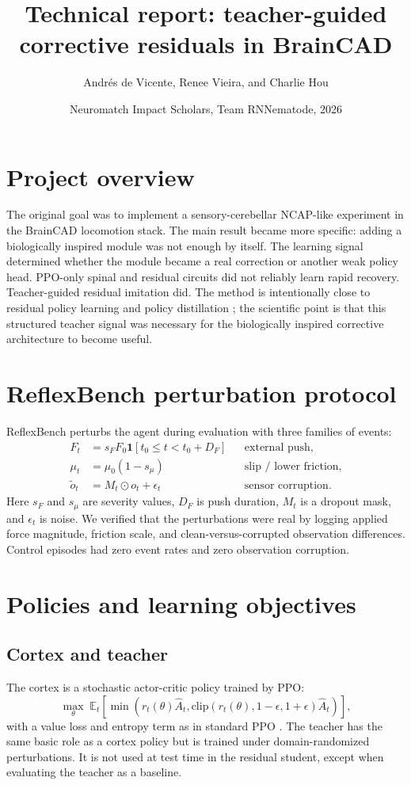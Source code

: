 \documentclass[11pt]{article}
\title{Technical report: teacher-guided corrective residuals in BrainCAD}
\author{Andr\'es de Vicente, Renee Vieira, and Charlie Hou}
\date{Neuromatch Impact Scholars, Team RNNematode, 2026}
\begin{document}
\maketitle

\section{Project overview}
The original goal was to implement a sensory-cerebellar NCAP-like experiment in the BrainCAD locomotion stack.  The main result became more specific: adding a biologically inspired module was not enough by itself.  The learning signal determined whether the module became a real correction or another weak policy head.  PPO-only spinal and residual circuits did not reliably learn rapid recovery.  Teacher-guided residual imitation did.  The method is intentionally close to residual policy learning and policy distillation \citep{johannink2018residualrl,rusu2015policydistillation,schmitt2018kickstarting}; the scientific point is that this structured teacher signal was necessary for the biologically inspired corrective architecture to become useful.

\section{ReflexBench perturbation protocol}
ReflexBench perturbs the agent during evaluation with three families of events:
\begin{align}
F_t &= s_F F_0 \mathbf{1}[t_0 \le t < t_0 + D_F] && \text{external push},\\
\mu_t &= \mu_0 (1 - s_\mu) && \text{slip / lower friction},\\
\tilde{o}_t &= M_t \odot o_t + \epsilon_t && \text{sensor corruption}.
\end{align}
Here $s_F$ and $s_\mu$ are severity values, $D_F$ is push duration, $M_t$ is a dropout mask, and $\epsilon_t$ is noise.  We verified that the perturbations were real by logging applied force magnitude, friction scale, and clean-versus-corrupted observation differences.  Control episodes had zero event rates and zero observation corruption.

\section{Policies and learning objectives}
\subsection{Cortex and teacher}
The cortex is a stochastic actor-critic policy trained by PPO:
\[
\max_\theta \; \mathbb{E}_t \left[\min(r_t(\theta) \hat{A}_t,
\mathrm{clip}(r_t(\theta), 1-\epsilon, 1+\epsilon)\hat{A}_t)\right],
\]
with a value loss and entropy term as in standard PPO \citep{schulman2017ppo}.  The teacher has the same basic role as a cortex policy but is trained under domain-randomized perturbations.  It is not used at test time in the residual student, except when evaluating the teacher as a baseline.
\end{document}
